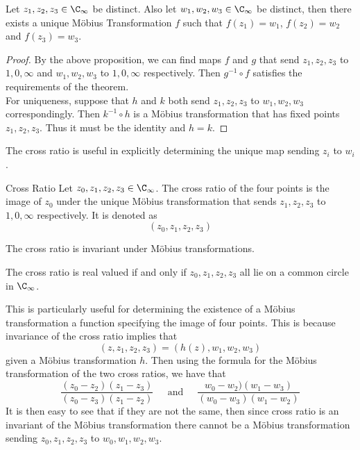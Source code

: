 \documentclass[a4paper]{article}
\begin{document}
\begin{thm}{}{} Let $z_1,z_2,z_3\in\C_\infty$ be distinct. Also let $w_1,w_2,w_3\in\C_\infty$ be distinct, then there exists a unique Möbius Transformation $f$ such that $f(z_1)=w_1$, $f(z_2)=w_2$ and $f(z_3)=w_3$. 
\begin{proof}
By the above proposition, we can find maps $f$ and $g$ that send $z_1,z_2,z_3$ to $1,0,\infty$ and $w_1,w_2,w_3$ to $1,0,\infty$ respectively. Then $g^{-1}\circ f$ satisfies the requirements of the theorem. \\

For uniqueness, suppose that $h$ and $k$ both send $z_1,z_2,z_3$ to $w_1,w_2,w_3$ correspondingly. Then $k^{-1}\circ h$ is a Möbius transformation that has fixed points $z_1,z_2,z_3$. Thus it must be the identity and $h=k$. 
\end{proof}
\end{thm}

The cross ratio is useful in explicitly determining the unique map sending $z_i$ to $w_i$. 

\begin{defn}{Cross Ratio}{} Let $z_0,z_1,z_2,z_3\in\C_\infty$. The cross ratio of the four points is the image of $z_0$ under the unique Möbius transformation that sends $z_1,z_2,z_3$ to $1,0,\infty$ respectively. It is denoted as $$(z_0,z_1,z_2,z_3)$$
\end{defn}

\begin{thm}{}{} The cross ratio is invariant under Möbius transformations. 
\end{thm}

\begin{thm}{}{} The cross ratio is real valued if and only if $z_0,z_1,z_2,z_3$ all lie on a common circle in $\C_\infty$. 
\end{thm}

This is particularly useful for determining the existence of a Möbius transformation a function specifying the image of four points. This is because invariance of the cross ratio implies that $$(z,z_1,z_2,z_3)=(h(z),w_1,w_2,w_3)$$ given a Möbius transformation $h$. Then using the formula for the Möbius transformation of the two cross ratios, we have that $$\frac{(z_0-z_2)(z_1-z_3)}{(z_0-z_3)(z_1-z_2)}\;\;\;\;\text{ and }\;\;\;\;\frac{w_0-w_2)(w_1-w_3)}{(w_0-w_3)(w_1-w_2)}$$ It is then easy to see that if they are not the same, then since cross ratio is an invariant of the Möbius transformation there cannot be a Möbius transformation sending $z_0,z_1,z_2,z_3$ to $w_0,w_1,w_2,w_3$. \\
\end{document}
